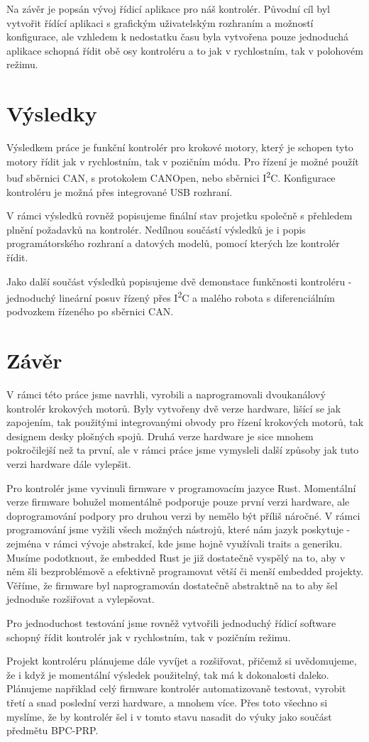 Na závěr je popsán vývoj řídicí aplikace pro náš kontrolér.
Původní cíl byl vytvořit řídící aplikaci s grafickým uživatelským rozhraním a možností konfigurace, ale vzhledem k nedostatku času byla vytvořena pouze jednoduchá aplikace schopná řídit obě osy kontroléru a to jak v rychlostním, tak v polohovém režimu.

\section*{Výsledky}
Výsledkem práce je funkční kontrolér pro krokové motory, který je schopen tyto motory řídit jak v rychlostním, tak v pozičním módu.
Pro řízení je možné použít buď sběrnici CAN, s protokolem CANOpen, nebo sběrnici I\textsuperscript{2}C.
Konfigurace kontroléru je možná přes integrované USB rozhraní.

V rámci výsledků rovněž popisujeme finální stav projetku společně s přehledem plnění požadavků na kontrolér.
Nedílnou součástí výsledků je i popis programátorského rozhraní a datových modelů, pomocí kterých lze kontrolér řídit.

Jako další součást výsledků popisujeme dvě demonstace funkčnosti kontroléru - jednoduchý lineární posuv řízený přes I\textsuperscript{2}C a malého robota s diferenciálním podvozkem řízeného po sběrnici CAN.

\section*{Závěr}
V rámci této práce jsme navrhli, vyrobili a naprogramovali dvoukanálový kontrolér krokových motorů.
Byly vytvořeny dvě verze hardware, lišící se jak zapojením, tak použitými integrovanými obvody pro řízení krokových motorů, tak designem desky plošných spojů.
Druhá verze hardware je sice mnohem pokročilejší než ta první, ale v rámci práce jsme vymysleli další způsoby jak tuto verzi hardware dále vylepšit.

Pro kontrolér jsme vyvinuli firmware v programovacím jazyce Rust.
Momentální verze firmware bohužel momentálně podporuje pouze první verzi hardware, ale doprogramování podpory pro druhou verzi by nemělo být příliš náročné.
V rámci programování jsme vyžili všech možných nástrojů, které nám jazyk poskytuje - zejména v rámci vývoje abstrakcí, kde jsme hojně využívali traits a generiku.
Musíme podotknout, že embedded Rust je již dostatečně vyspělý na to, aby v něm šli bezproblémově a efektivně programovat větší či menší embedded projekty.
Věříme, že firmware byl naprogramován dostatečně abstraktně na to aby šel jednoduše rozšiřovat a vylepšovat.

Pro jednoduchost testování jsme rovněž vytvořili jednoduchý řídicí software schopný řídit kontrolér jak v rychlostním, tak v pozičním režimu.

Projekt kontroléru plánujeme dále vyvíjet a rozšiřovat, přičemž si uvědomujeme, že i když je momentální výsledek použitelný, tak má k dokonalosti daleko.
Plánujeme napřiklad celý firmware kontrolér automatizovaně testovat, vyrobit třetí a snad poslední verzi hardware, a mnohem více.
Přes toto všechno si myslíme, že by kontrolér šel i v tomto stavu nasadit do výuky jako součást předmětu BPC-PRP.
